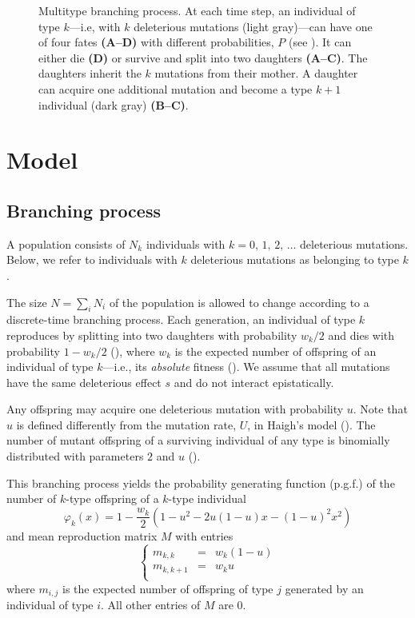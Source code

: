 \documentclass[9pt,lineno]{elife}
\begin{document}
\begin{figure}[!ht]
 	\caption{Multitype branching process.  At each time step, an individual of type $k$---i.e, with $k$ deleterious mutations (light gray)---can have one of four fates \textbf{(A--D)} with different probabilities, $P$ (see ).  
%
It can either die \textbf{(D)}
%
or survive and split into two daughters \textbf{(A--C)}. 
%
The daughters inherit the $k$ mutations from their mother.
%
A daughter can acquire one additional mutation and become a type $k+1$ individual (dark gray) \textbf{(B--C)}.}
	\label{fig:branching}	
\end{figure}




\section{Model}




\subsection{Branching process}

A population consists of $N_k$ individuals with $k=0,\, 1,\, 2,\, \ldots$ deleterious mutations.  Below, we refer to individuals with $k$ deleterious mutations as belonging to type $k$.

The size $N = \sum_i N_i$ of the population is allowed to change according to a discrete-time branching process.   
Each generation, an individual of type $k$ reproduces by splitting into two daughters with probability $w_k/2$ and dies with probability $1 - w_k/2$ (), where $w_k$ is the 
expected number of offspring 
of an individual of type $k$---i.e., its  \textit{absolute} fitness (). 
We assume that all mutations have the same deleterious effect $s$ and do not interact epistatically.  

Any offspring may acquire one deleterious mutation with probability $u$. 
Note that $u$ is defined differently from the mutation rate, $U$, in Haigh's model ().
The number of mutant offspring of a surviving individual of any type is binomially distributed  with parameters $2$ and $u$ ().

This branching process
yields the probability generating function (p.g.f.) of the number of $k$-type offspring of a $k$-type individual 
%
\begin{equation}
  \varphi_{k}(x)=1-\frac{w_k}{2}\left(1-u^2-2u(1\!-\!u)x-(1\!-\!u)^2x^2\right)
  \label{eq:pgf}
\end{equation}
%
and mean reproduction matrix $M$ with entries 
%
\begin{equation}
  \left\{\begin{array}{lll}
            m_{k,k} & = & w_k (1-u)\\
            m_{k,k+1} & = & w_k u\\
            \end{array} \right.
  \label{eq:m}
\end{equation}
%
where $m_{i,j}$ is the expected number of offspring of type $j$ generated by an individual of type $i$.  All other entries of $M$ are 0.
\end{document}
